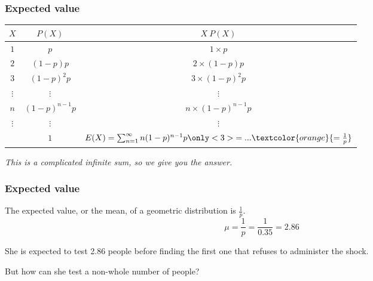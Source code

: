 \documentclass[slidestop,compress,mathserif]{beamer}
\begin{document}
\begin{frame}
\frametitle{Expected value}


\pause

\begin{center}
\renewcommand{\arraystretch}{1.5}
\begin{tabular}{c | c | c }
$X$   & $P(X)$              & $X ~ P(X)$         \\
\hline
$1$   & $p$                 & $1 \times p$       \\
$2$   & $(1-p)p$            & $2 \times (1-p)p$  \\
$3$   & $(1-p)^2 p$         & $3 \times (1-p)^2 p$ \\
$\vdots$   & $\vdots$       & $\vdots$           \\
$n$   & $(1-p)^{n-1} p$     & $n \times (1-p)^{n-1} p$ \\
$\vdots$   & $\vdots$       & $\vdots$           \\
\hline
      & $1$                 & $E(X) = \sum_{n=1}^{\infty} n (1-p)^{n-1} p \only<3>{=... \textcolor{orange}{= \frac{1}{p}}}$ \\
\end{tabular}
\end{center}
\pause

\textit{This is a complicated infinite sum, so we give you the answer.}

\end{frame}



\begin{frame}
\frametitle{Expected value}


The expected value, or the mean, of a geometric distribution is $\frac{1}{p}$.
\[ \mu = \frac{1}{p} = \frac{1}{0.35} = 2.86 \]

\pause

She is expected to test 2.86 people before finding the first one that refuses to administer the shock. 

\pause

But how can she test a non-whole number of people?

\end{frame}
\end{document}
